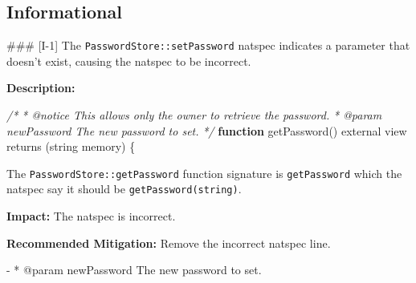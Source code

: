 \documentclass[
  paper=a4,
  ,captions=tableheading
]{scrartcl}
\newenvironment{Shaded}{}{}
\newcommand{\CommentTok}[1]{\textcolor[rgb]{0.38,0.63,0.69}{\textit{#1}}}
\newcommand{\FunctionTok}[1]{\textcolor[rgb]{0.02,0.16,0.49}{#1}}
\newcommand{\KeywordTok}[1]{\textcolor[rgb]{0.00,0.44,0.13}{\textbf{#1}}}
\newcommand{\NormalTok}[1]{#1}
\newcommand{\StringTok}[1]{\textcolor[rgb]{0.25,0.44,0.63}{#1}}
\begin{document}
\subsection{Informational}\label{informational}

\#\#\# {[}I-1{]} The \texttt{PasswordStore::setPassword} natspec
indicates a parameter that doesn't exist, causing the natspec to be
incorrect.

\textbf{Description:}

\begin{Shaded}
\begin{Highlighting}[]
    \CommentTok{/*}
\CommentTok{     * @notice This allows only the owner to retrieve the password.}
\CommentTok{     * @param newPassword The new password to set.}
\CommentTok{     */}
    \KeywordTok{function} \FunctionTok{getPassword}\NormalTok{() external view }\FunctionTok{returns}\NormalTok{ (string memory) \{}
\end{Highlighting}
\end{Shaded}

The \texttt{PasswordStore::getPassword} function signature is
\texttt{getPassword} which the natspec say it should be
\texttt{getPassword(string)}.

\textbf{Impact:} The natspec is incorrect.

\textbf{Recommended Mitigation:} Remove the incorrect natspec line.

\begin{Shaded}
\begin{Highlighting}[]
\StringTok{{-}  * @param newPassword The new password to set.}
\end{Highlighting}
\end{Shaded}
\end{document}
